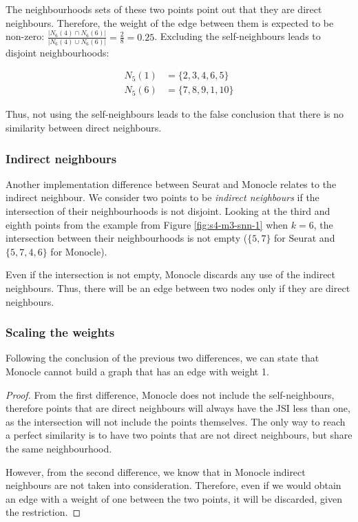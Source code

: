 The neighbourhoods sets of these two points point out that they are direct neighbours. Therefore, the weight of the edge between them is expected to be non-zero: $\displaystyle \frac{|N_6(4)  \cap N_6(6)|}{|N_6(4)  \cup N_6(6)|} = \frac{2}{8} = 0.25$. Excluding the self-neighbours leads to disjoint neighbourhoods:

\[ \begin{aligned}
        N_5(1) & = \{2,3,4,6,5\}  \\
        N_5(6) & = \{7,8,9,1,10\}
    \end{aligned}
\]

Thus, not using the self-neighbours leads to the false conclusion that there is no similarity between direct neighbours.

\subsubsection{Indirect neighbours}
Another implementation difference between Seurat and Monocle relates to the indirect neighbour. We consider two points to be \textit{indirect neighbours} if the intersection of their neighbourhoods is not disjoint. Looking at the third and eighth points from the example from Figure \ref{fig:s4-m3-snn-1} when $k = 6$, the intersection between their neighbourhoods is not empty ($\{5, 7\}$ for Seurat and $\{5,7,4,6\}$ for Monocle).

Even if the intersection is not empty, Monocle discards any use of the indirect neighbours. Thus, there will be an edge between two nodes only if they are direct neighbours.

\subsubsection{Scaling the weights}
Following the conclusion of the previous two differences, we can state that Monocle cannot build a graph that has an edge with weight 1.

\begin{proof} From the first difference, Monocle does not include the self-neighbours, therefore points that are direct neighbours will always have the JSI less than one, as the intersection will not include the points themselves. The only way to reach a perfect similarity is to have two points that are not direct neighbours, but share the same neighbourhood.

    However, from the second difference, we know that in Monocle indirect neighbours are not taken into consideration. Therefore, even if we would obtain an edge with a weight of one between the two points, it will be discarded, given the restriction.
\end{proof}


